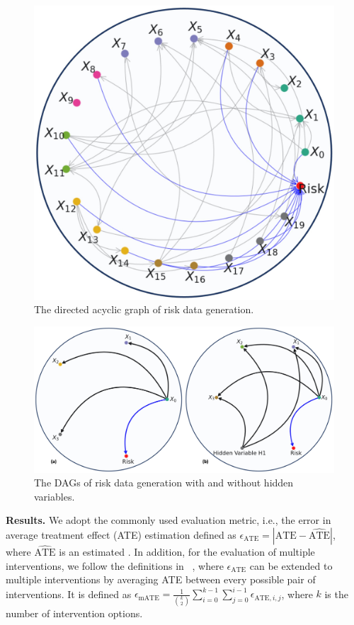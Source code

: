 \documentclass[letterpaper]{article} %
\theoremstyle{definition}
\theoremstyle{remark}
\begin{document}
\begin{figure}[h]
\centering
\includegraphics[width=0.5\linewidth]{generation.jpg}

\caption{The directed acyclic graph of risk data generation.}

\label{fig:generation}
\end{figure}

\begin{figure}
\centering
\includegraphics[width=0.95\linewidth]{add_hidden.jpg}

\caption{The DAGs of risk data generation with and without hidden variables.}

\label{fig:add hidden}
\end{figure}





\noindent\textbf{Results.} We adopt the commonly used evaluation metric, i.e., the error in average treatment effect (ATE) estimation defined as $\epsilon_\text{ATE}  = |\text{ATE} - \widehat{\text{ATE}}|$, where $\widehat{\text{ATE}}$ is an estimated . In addition, for the evaluation of multiple interventions, we follow the definitions in ~\cite{schwab2018perfect}, where $\epsilon_\text{ATE}$ can be extended to multiple interventions by averaging ATE between every possible pair of interventions. It is defined as $\epsilon_\text{mATE}  = \frac{1}{\binom {k}2}\sum_{i=0}^{k-1}\sum_{j=0}^{i-1}\epsilon_{\text{ATE},i,j}$, where $k$ is the number of intervention options.
\end{document}

